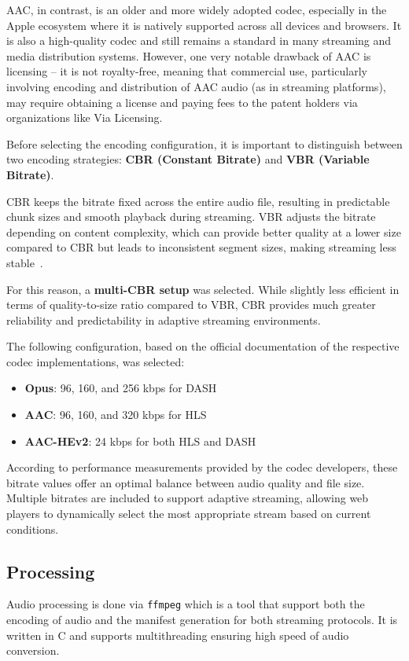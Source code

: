 AAC, in contrast, is an older and more widely adopted codec,
especially in the Apple ecosystem where it is natively supported across all devices and
browsers. It is also a high-quality codec\cite{opusefficiency}
and still remains a standard in many streaming and media distribution systems.
However, one very notable drawback of AAC is licensing – it is not royalty-free, meaning that commercial use,
particularly involving encoding and distribution of AAC audio (as in streaming platforms),
may require obtaining a license and paying fees to the patent holders via organizations like Via Licensing.\cite{vialicensing}


Before selecting the encoding configuration, it is important to distinguish
between two encoding strategies: \textbf{CBR (Constant Bitrate)}\cite{cbr} and \textbf{VBR (Variable Bitrate)}\cite{vbr}.

CBR keeps the bitrate fixed across the entire audio file, resulting in predictable chunk
sizes and smooth playback during streaming. VBR adjusts the bitrate depending on content complexity,
which can provide better quality at a lower size compared to CBR but leads to inconsistent segment sizes,
making streaming less stable~\cite{cbrvbrcomp}.

For this reason, a \textbf{multi-CBR setup} was selected.
While slightly less efficient in terms of quality-to-size ratio compared to VBR,
CBR provides much greater reliability and predictability in adaptive streaming environments.

The following configuration, based on the official documentation of the respective codec implementations, was selected:
\begin{itemize}[leftmargin=1.5cm]
    \item \textbf{Opus}: 96, 160, and 256 kbps for DASH
    \item \textbf{AAC}: 96, 160, and 320 kbps for HLS
    \item \textbf{AAC-HEv2}: 24 kbps for both HLS and DASH
\end{itemize}
According to performance measurements provided by the codec developers,
these bitrate values offer an optimal balance between audio quality and file size.
Multiple bitrates are included to support adaptive streaming,
allowing web players to dynamically select the most appropriate stream based on current conditions.

\subsection{Processing}
Audio processing is done via \texttt{ffmpeg}\cite{ffmpeg} which is a tool that support both the encoding of audio and the
manifest generation for both streaming protocols. It is written in C and supports multithreading ensuring high speed of
audio conversion.

